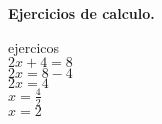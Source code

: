 \documentclass[a4paper,addpoints]{exam}
\begin{document}
\begin{center}
\textbf{Ejercicios de calculo. } \\
\end{center}
ejercicos\\

$2x+4 = 8$\\

$2x = 8-4$\\

$2x = 4$\\

$x= \frac{4}{2}$\\


$x=2$
\end{document}
